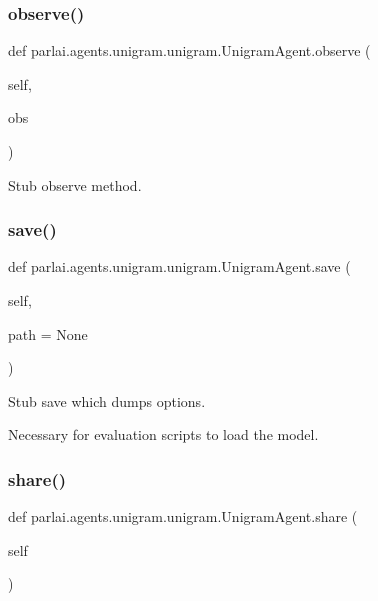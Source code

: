 \subsubsection{\texorpdfstring{observe()}{observe()}}
{\footnotesize\ttfamily def parlai.\+agents.\+unigram.\+unigram.\+Unigram\+Agent.\+observe (\begin{DoxyParamCaption}\item[{}]{self,  }\item[{}]{obs }\end{DoxyParamCaption})}

\begin{DoxyVerb}Stub observe method.
\end{DoxyVerb}
 \mbox{\label{classparlai_1_1agents_1_1unigram_1_1unigram_1_1UnigramAgent_ae0178adc22b61bc37632eed426f853df}} 
\subsubsection{\texorpdfstring{save()}{save()}}
{\footnotesize\ttfamily def parlai.\+agents.\+unigram.\+unigram.\+Unigram\+Agent.\+save (\begin{DoxyParamCaption}\item[{}]{self,  }\item[{}]{path = {\ttfamily None} }\end{DoxyParamCaption})}

\begin{DoxyVerb}Stub save which dumps options.

Necessary for evaluation scripts to load the model.
\end{DoxyVerb}
 \mbox{\label{classparlai_1_1agents_1_1unigram_1_1unigram_1_1UnigramAgent_a92213f8bec03859a310d5535a077e999}} 
\subsubsection{\texorpdfstring{share()}{share()}}
{\footnotesize\ttfamily def parlai.\+agents.\+unigram.\+unigram.\+Unigram\+Agent.\+share (\begin{DoxyParamCaption}\item[{}]{self }\end{DoxyParamCaption})}

